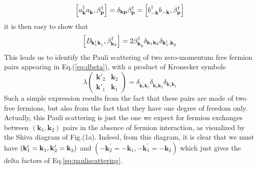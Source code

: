 \documentclass[epj]{svjour}
\newcommand{\vk}{\ensuremath{\mathbf{k}}}
\begin{document}
\begin{equation}  \label{eq:aBeta}
\left[a^{\dagger}_{\mathbf{k} }a^{}_{\mathbf{k} },\beta^{\dagger}_{\mathbf{p}
}\right]  =\delta_{\mathbf{k} \mathbf{p} }\beta^{\dagger}_{\mathbf{p} }=%
\left[b^{\dagger}_{-\mathbf{k} }b^{}_{-\mathbf{k} },\beta^{\dagger}_{\mathbf{%
p} }\right]  
\end{equation}
it is then easy to show that 
\begin{equation}  \label{eq:Dcom}
\left[\mathit{D} _{\mathbf{k} ^{\prime}_1\mathbf{k} ^{}_1},\beta^{\dagger}_{%
\mathbf{k} _2}\right]  =2\beta^{\dagger}_{\mathbf{k} ^{}_2}\delta_{\mathbf{k} _1%
\mathbf{k} _2}\delta_{\mathbf{k} ^{\prime}_1,\mathbf{k} ^{}_2}
\end{equation}
This leads us to identify the Pauli scattering of two zero-momentum free fermion pairs appearing in Eq.(\ref{eq:dbeta}), with a
product of Kronecker symbols 
\begin{equation}  \label{eq:pauliscattering}
\lambda\left(\begin{smallmatrix}\vk'_2&\vk_2\\\vk'_1&\vk_1\end{smallmatrix}%
\right)  =\delta_{\mathbf{k} ^{\prime}_1\mathbf{k} ^{}_1}\delta_{\mathbf{k}
^{\prime}_2\mathbf{k} ^{}_2}\delta_{\mathbf{k} ^{}_1\mathbf{k} ^{}_2}
\end{equation}
Such a simple expression results from the fact that these pairs are made of two free fermions, but also from the fact that they have one degree of freedom only.
Actually, this Pauli scattering is just the one we expect for fermion exchanges between $\left(\mathbf{k} _1,\mathbf{k} _2\right) $ pairs in the absence of fermion interaction,
as visualized by the Shiva diagram of Fig.(1a). Indeed, from this
diagram, it is clear that we must have $\left(\mathbf{k} ^{\prime}_1=\mathbf{%
k} ^{}_1,\mathbf{k} ^{\prime}_2=\mathbf{k} ^{}_2\right) $ and $\left(-\mathbf{k}
^{\prime}_2=-\mathbf{k} ^{}_1,-\mathbf{k} ^{\prime}_1=-\mathbf{k} ^{}_2\right) $ which just gives the delta
factors of Eq.\eqref{eq:pauliscattering}.
\end{document}

